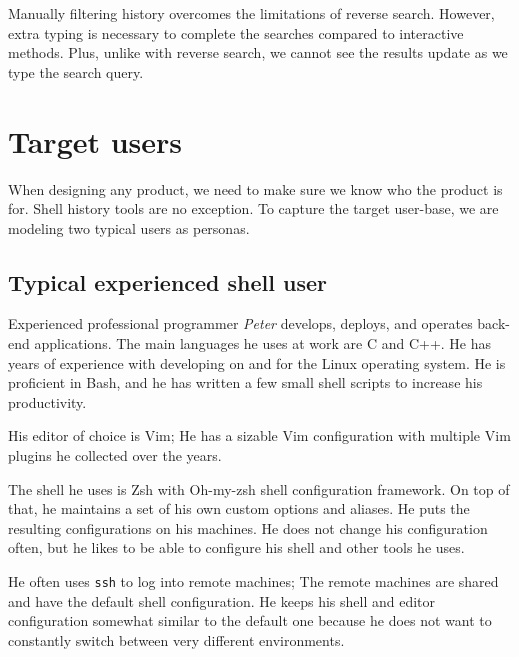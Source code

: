 Manually filtering history overcomes the limitations of reverse search. However, extra typing is necessary to complete the searches compared to interactive methods. Plus, unlike with reverse search, we cannot see the results update as we type the search query.


\section{Target users}

When designing any product, we need to make sure we know who the product is for. Shell history tools are no exception. To capture the target user-base, we are modeling two typical users as personas.%

\subsection{Typical experienced shell user}

Experienced professional programmer \textit{Peter} develops, deploys, and operates back-end applications. The main languages he uses at work are C and C++. He has years of experience with developing on and for the Linux operating system. He is proficient in Bash, and he has written a few small shell scripts to increase his productivity.

His editor of choice is Vim; He has a sizable Vim configuration with multiple Vim plugins he collected over the years.

The shell he uses is Zsh with Oh-my-zsh \cite{toolsohmyzsh} shell configuration framework. On top of that, he maintains a set of his own custom options and aliases. He puts the resulting configurations on his machines. He does not change his configuration often, but he likes to be able to configure his shell and other tools he uses.

He often uses \verb|ssh| to log into remote machines; The remote machines are shared and have the default shell configuration. He keeps his shell and editor configuration somewhat similar to the default one because he does not want to constantly switch between very different environments. 

